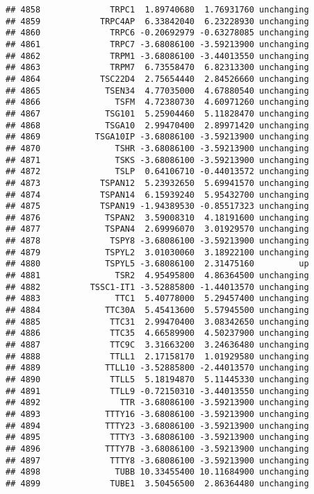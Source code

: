 \documentclass[]{article}
\begin{document}
\begin{verbatim}
## 4858              TRPC1  1.89740680  1.76931760 unchanging
## 4859            TRPC4AP  6.33842040  6.23228930 unchanging
## 4860              TRPC6 -0.20692979 -0.63278085 unchanging
## 4861              TRPC7 -3.68086100 -3.59213900 unchanging
## 4862              TRPM1 -3.68086100 -3.44013550 unchanging
## 4863              TRPM7  6.73558470  6.82313300 unchanging
## 4864            TSC22D4  2.75654440  2.84526660 unchanging
## 4865             TSEN34  4.77035000  4.67880540 unchanging
## 4866               TSFM  4.72380730  4.60971260 unchanging
## 4867             TSG101  5.25904460  5.11828470 unchanging
## 4868             TSGA10  2.99470400  2.89971420 unchanging
## 4869           TSGA10IP -3.68086100 -3.59213900 unchanging
## 4870               TSHR -3.68086100 -3.59213900 unchanging
## 4871               TSKS -3.68086100 -3.59213900 unchanging
## 4872               TSLP  0.64106710 -0.44013572 unchanging
## 4873            TSPAN12  5.23932650  5.69941570 unchanging
## 4874            TSPAN14  6.15939240  5.95432700 unchanging
## 4875            TSPAN19 -1.94389530 -0.85517323 unchanging
## 4876             TSPAN2  3.59008310  4.18191600 unchanging
## 4877             TSPAN4  2.69996070  3.01929570 unchanging
## 4878              TSPY8 -3.68086100 -3.59213900 unchanging
## 4879             TSPYL2  3.01030060  3.18922100 unchanging
## 4880             TSPYL5 -3.68086100  2.31475160         up
## 4881               TSR2  4.95495800  4.86364500 unchanging
## 4882          TSSC1-IT1 -3.52885800 -1.44013570 unchanging
## 4883               TTC1  5.40778000  5.29457400 unchanging
## 4884             TTC30A  5.45413600  5.57945500 unchanging
## 4885              TTC31  2.99470400  3.08342650 unchanging
## 4886              TTC35  4.66589900  4.50237900 unchanging
## 4887              TTC9C  3.31663200  3.24636480 unchanging
## 4888              TTLL1  2.17158170  1.01929580 unchanging
## 4889             TTLL10 -3.52885800 -2.44013570 unchanging
## 4890              TTLL5  5.18194870  5.11445330 unchanging
## 4891              TTLL9 -0.72150310 -3.44013550 unchanging
## 4892                TTR -3.68086100 -3.59213900 unchanging
## 4893             TTTY16 -3.68086100 -3.59213900 unchanging
## 4894             TTTY23 -3.68086100 -3.59213900 unchanging
## 4895              TTTY3 -3.68086100 -3.59213900 unchanging
## 4896             TTTY7B -3.68086100 -3.59213900 unchanging
## 4897              TTTY8 -3.68086100 -3.59213900 unchanging
## 4898               TUBB 10.33455400 10.11684900 unchanging
## 4899              TUBE1  3.50456500  2.86364480 unchanging

\end{verbatim}
\end{document}
